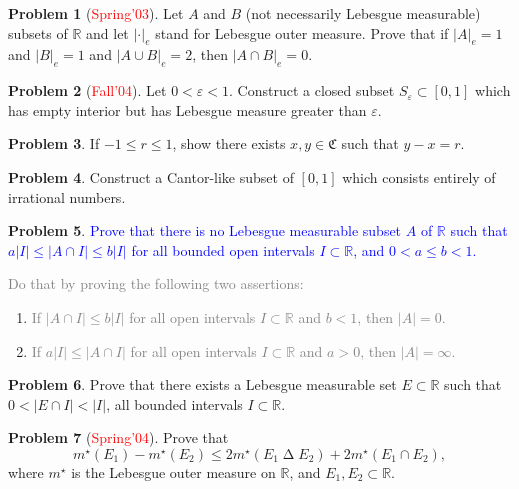 \documentclass[12pt]{amsart}
\def\field#1{\mathbb{#1}}
\def\abs#1{\lvert {#1} \rvert}
\theoremstyle{definition}
\newtheorem{problem}{Problem}
\theoremstyle{remark}
\begin{document}
\begin{problem}[\textcolor{red}{Spring'03}]
  Let $A$ and $B$ (not necessarily Lebesgue measurable) subsets of
  $\field{R}$ and let $\abs{\cdot}_e$ stand for Lebesgue outer
  measure.  Prove that if $\abs{A}_e =1$ and $\abs{B}_e=1$ and $\abs{A
  \cup B}_e = 2$, then $\abs{ A \cap B }_e = 0$.
\end{problem}
\begin{problem}[\textcolor{red}{Fall'04}]
  Let $0 < \varepsilon <1$.  Construct a closed subset $S_\varepsilon
  \subset [0,1]$ which has empty interior but has Lebesgue measure
  greater than $\varepsilon$.
\end{problem}
\begin{problem}
  If $-1 \leq r \leq 1$, show there exists $x, y \in \mathfrak{C}$
  such that $y - x = r$.
\end{problem}
\begin{problem}
  Construct a Cantor-like subset of $[0,1]$ which consists entirely of
  irrational numbers.
\end{problem}
\begin{problem}
  \textcolor{blue}{Prove that there is no Lebesgue measurable subset
    $A$ of $\field{R}$ such that $a \abs{I} \leq \abs{A \cap I} \leq b
    \abs{I}$ for all bounded open intervals $I \subset \field{R}$, and
    $0 < a \leq b < 1$.}

  \textcolor{gray}{Do that by proving the following two assertions:}
  \begin{enumerate}
  \item \textcolor{gray}{If $\abs{A \cap I} \leq b\abs{I}$ for all
      open intervals $I \subset \field{R}$ and $b < 1$, then $\abs{A}
      = 0$.}
  \item \textcolor{gray}{If $a\abs{I} \leq \abs{A \cap I}$ for all
      open intervals $I \subset \field{R}$ and $a >0$, then $\abs{A} =
      \infty$.}
  \end{enumerate}
\end{problem}
\begin{problem}
  Prove that there exists a Lebesgue measurable set $E \subset
  \field{R}$ such that $0 < \abs{E \cap I} < \abs{I}$, all bounded
  intervals $I \subset \field{R}$.
\end{problem}
\begin{problem}[\textcolor{red}{Spring'04}]
  Prove that
  \begin{equation*}
    m^\star (E_1) - m^\star(E_2) \leq 2 m^\star(E_1
    \operatorname{\Delta} E_2) + 2 m^\star (E_1 \cap E_2),
  \end{equation*}
  where $m^\star$ is the Lebesgue outer measure on $\field{R}$, and
  $E_1, E_2 \subset \field{R}$.
\end{problem}
\end{document}
